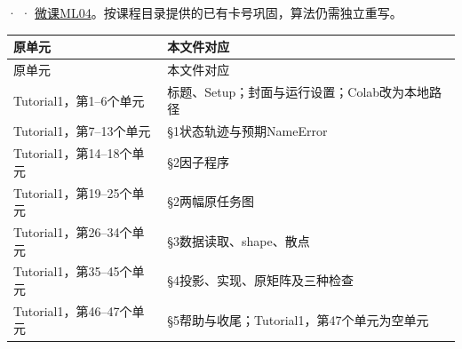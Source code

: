 ·  · \href{https://crazyshout.github.io/micro-course/?lesson=ml04}{微课ML04}。按课程目录提供的已有卡号巩固，算法仍需独立重写。





\begingroup
\small\setlength{\tabcolsep}{3pt}
\renewcommand{\arraystretch}{1.22}
\begin{longtable}{@{}>{\raggedright\arraybackslash}p{}>{\raggedright\arraybackslash}p{}@{}}
\toprule
原单元 & 本文件对应 \\
\midrule\endfirsthead
原单元 & 本文件对应 \\
\midrule\endhead
\bottomrule\endfoot
Tutorial1，第1–6个单元 & 标题、Setup；封面与运行设置；Colab改为本地路径 \\
Tutorial1，第7–13个单元 & §1状态轨迹与预期NameError \\
Tutorial1，第14–18个单元 & §2因子程序 \\
Tutorial1，第19–25个单元 & §2两幅原任务图 \\
Tutorial1，第26–34个单元 & §3数据读取、shape、散点 \\
Tutorial1，第35–45个单元 & §4投影、实现、原矩阵及三种检查 \\
Tutorial1，第46–47个单元 & §5帮助与收尾；Tutorial1，第47个单元为空单元 \\
\end{longtable}
\endgroup
